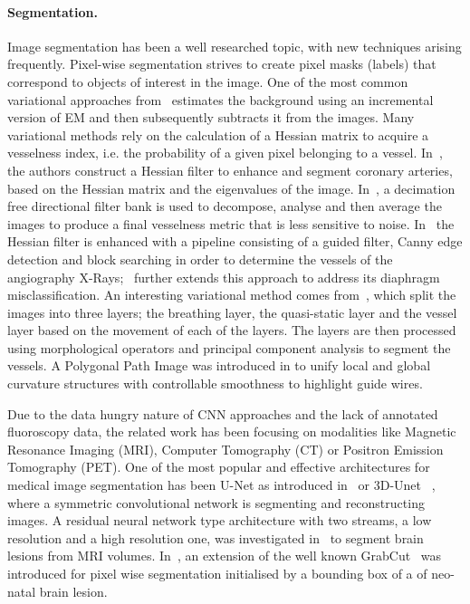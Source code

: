 \documentclass{bmvc2k}
\begin{document}
	\paragraph{Segmentation.} 
	Image segmentation has been a well researched topic, with new techniques arising frequently. Pixel-wise segmentation strives to create pixel masks (labels) that correspond to objects of interest in the image. One of the most common variational approaches from~\cite{Friedman2013} estimates  the background using an incremental version of EM and then subsequently subtracts it from the images. Many variational methods rely on the calculation of a Hessian matrix to acquire a vesselness index, i.e. the probability of a given pixel  belonging to a vessel. In~\cite{Hessian_segmentation},\cite{Felfelian2016} the authors construct a Hessian filter to enhance and segment coronary arteries, based on the Hessian matrix and the eigenvalues of the image. In~\cite{vessel_enh_directional_filter_bank},  a decimation free directional filter bank is used to decompose, analyse and then average the images to produce a final vesselness metric that is less sensitive to noise. In~\cite{vessel_detection_coronary} the Hessian filter is enhanced with a pipeline consisting of a guided filter, Canny edge detection and block searching in order to determine the vessels of the angiography X-Rays;~\cite{diaphragm_detection} further extends this approach to address its diaphragm misclassification. An interesting variational method comes from~\cite{layer_segmentation_vessels}, which split the images into three layers; the breathing layer, the quasi-static layer and the vessel layer based on the movement of each of the layers. The layers are then processed using morphological operators and principal component analysis to segment the vessels.    A Polygonal Path Image was introduced in \cite{Polygonal_path_image} to unify local and global curvature structures with controllable smoothness to highlight guide wires.
	
	Due to the data hungry nature of CNN approaches and the lack of annotated fluoroscopy data, the related work has been focusing on modalities like Magnetic Resonance Imaging (MRI), Computer Tomography (CT) or Positron Emission Tomography (PET). One of the most popular and effective architectures for medical image segmentation has been U-Net as introduced in~\cite{unet} or 3D-Unet ~\cite{arXiv:1606.06650}, where a symmetric convolutional network is segmenting and reconstructing  images. A residual neural network type architecture with two streams, a low resolution and a high resolution one, was investigated in~\cite{Kamnitsas16} to segment brain lesions from MRI volumes. In~\cite{Rajchl16}, an extension of the well known GrabCut~\cite{Rother04} was introduced  for pixel wise segmentation initialised by a bounding box of a of neo-natal brain lesion.
	
\end{document}
